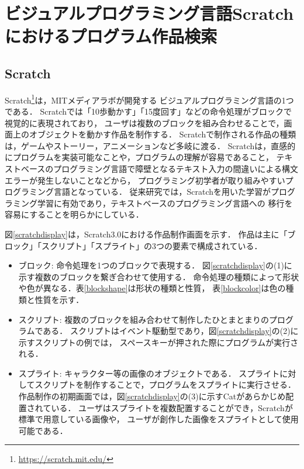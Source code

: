 \documentclass[11pt]{jreport}
\begin{document}
\chapter{ビジュアルプログラミング言語Scratchにおけるプログラム作品検索}

\section{Scratch}
\label{scratchsetumei}
Scratch\footnote{ \url{https://scratch.mit.edu/}}は，MITメディアラボが開発する
ビジュアルプログラミング言語の1つである．
Scratchでは「10歩動かす」「15度回す」などの命令処理がブロックで視覚的に表現されており，
ユーザは複数のブロックを組み合わせることで，画面上のオブジェクトを動かす作品を制作する．
Scratchで制作される作品の種類は，ゲームやストーリー，アニメーションなど多岐に渡る\cite{wild}．
Scratchは，直感的にプログラムを実装可能なことや，プログラムの理解が容易であること，
テキストベースのプログラミング言語で障壁となるテキスト入力の間違いによる構文エラーが発生しないことなどから，
プログラミング初学者が取り組みやすいプログラミング言語となっている．
従来研究では，Scratchを用いた学習がプログラミング学習に有効であり，テキストベースのプログラミング言語への
移行を容易にすることを明らかにしている\cite{blocktotext}\cite{blockandbeyond}．

図\ref{scratchdisplay}は，Scratch3.0における作品制作画面を示す．
作品は主に「ブロック」「スクリプト」「スプライト」の3つの要素で構成されている．

\begin{itemize}
    \item ブロック: 命令処理を1つのブロックで表現する．
    図\ref{scratchdisplay}の(1)に示す複数のブロックを繋ぎ合わせて使用する．
    命令処理の種類によって形状や色が異なる．表\ref{blockshape}は形状の種類と性質，
    表\ref{blockcolor}は色の種類と性質を示す．
    \item スクリプト: 複数のブロックを組み合わせて制作したひとまとまりのプログラムである．
    スクリプトはイベント駆動型であり，図\ref{scratchdisplay}の(2)に示すスクリプトの例では，
    スペースキーが押された際にプログラムが実行される．
    \item スプライト: キャラクター等の画像のオブジェクトである．
    スプライトに対してスクリプトを制作することで，プログラムをスプライトに実行させる．
    作品制作の初期画面では，図\ref{scratchdisplay}の(3)に示すCatがあらかじめ配置されている．
    ユーザはスプライトを複数配置することができ，Scratchが標準で用意している画像や，
    ユーザが創作した画像をスプライトとして使用可能である．
\end{itemize}
\end{document}
